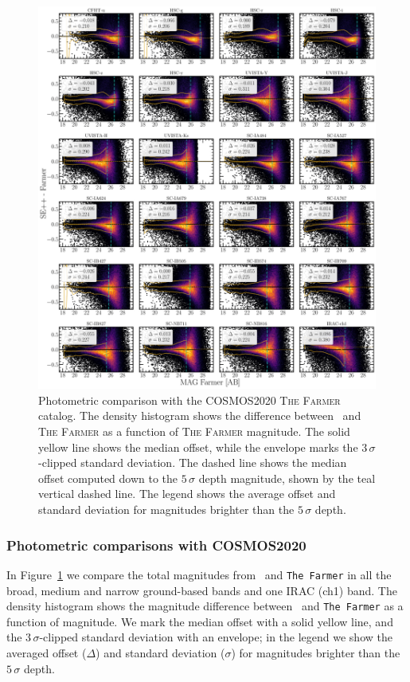 \documentclass[longauth]{aa}
\begin{document}
\begin{figure}[ht!]
\includegraphics[width=1\textwidth]{figures/Mag-Compar-C20F.pdf}
\caption{Photometric comparison with the COSMOS2020 \textsc{The Farmer} catalog. The density histogram shows the difference between \SEpp\ and \textsc{The Farmer} as a function of \textsc{The Farmer} magnitude. The solid yellow line shows the median offset, while the envelope marks the $3\,\sigma$-clipped standard deviation. The dashed line shows the median offset computed down to the $5\, \sigma$ depth magnitude, shown by the teal vertical dashed line. The legend shows the average offset and standard deviation for magnitudes brighter than the $5\, \sigma$ depth.}
\label{fig:Mag-Compar-C20F}
\end{figure}

\subsubsection{Photometric comparisons with COSMOS2020}
In Figure~\ref{fig:Mag-Compar-C20F} we compare the total magnitudes from \SEpp\ and \texttt{The Farmer} in all the broad, medium and narrow ground-based bands and one IRAC (ch1) band. The density histogram shows the magnitude difference between \SEpp\ and \texttt{The Farmer} as a function of magnitude. We mark the median offset with a solid yellow line, and the $3\,\sigma$-clipped standard deviation with an envelope; in the legend we show the averaged offset ($\Delta$) and standard deviation ($\sigma$) for magnitudes brighter than the $5\, \sigma$ depth.
\end{document}
